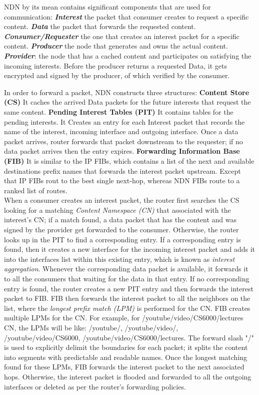 \documentclass[twocolumn]{article}
\begin{document}
NDN by its mean contains significant components that are used for communication: \textbf{\textit{Interest}} the packet that consumer creates to request a specific content. \textbf{\textit{Data}} the packet that forwards the requested content. \textbf{\textit{Consumer/Requester}} the one that creates an interest packet for a specific content. \textbf{\textit{Producer}} the node that generates and owns the actual content. \textbf{\textit{Provider}}: the node that has a cached content and participates on satisfying the incoming interests. Before the producer returns a requested Data, it gets encrypted and signed by the producer, of which verified by the consumer. 


In order to forward a packet, NDN constructs three structures\cite{Zhang:2014:NDN:2656877.2656887}: \textbf{Content Store (CS)} It caches the arrived Data packets for the future interests that request the same content. \textbf{Pending Interest Tables (PIT)} It contains tables for the pending interests. It Creates an entry for each Interest packet that records the name of the interest, incoming interface and outgoing interface. Once a data packet arrives, router forwards that packet downstream to the requester; if no data packet arrives then the entry expires. \textbf{Forwarding Information Base (FIB)} It is similar to the IP FIBs, which contains a list of the next and available destinations prefix names that forwards the interest packet upstream. Except that IP FIBs rout to the best single next-hop, whereas NDN FIBs route to a ranked list of routes.\\
When a consumer creates an interest packet, the router first searches the CS looking for a matching \textit{Content Namespace (CN)} that associated with the interest's CN; if a match found, a data packet that has the content and was signed by the provider get forwarded to the consumer. Otherwise, the router looks up in the PIT to find a corresponding entry. If a corresponding entry is found, then it creates a new interface for the incoming interest packet and adds it into the interfaces list within this existing entry, which is known as \textit{interest aggregation}. Whenever the corresponding data packet is available, it forwards it to all the consumers that waiting for the data in that entry. If no corresponding entry is found, the router creates a new PIT entry and then forwards the interest packet to FIB. FIB then forwards the interest packet to all the neighbors on the list, where the \textit{longest prefix match (LPM)} is performed for the CN. FIB creates multiple LPMs for the CN. For example, for /youtube/video/CS6000/lectures CN, the LPMs will be like: /youtube/, /youtube/video/, /youtube/video/CS6000, /youtube/video/CS6000/lectures. The forward slash "/" is used to explicitly delimit the boundaries for each packet; it splits the content into segments with predictable and readable names. Once the longest matching found for these LPMs, FIB forwards the interest packet to the next associated hops. Otherwise, the interest packet is flooded and forwarded to all the outgoing interfaces or deleted as per the router's forwarding policies.
\end{document}
